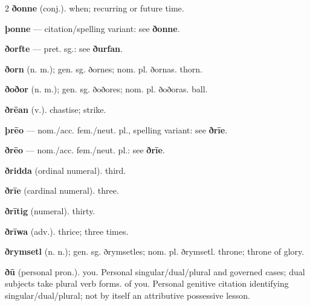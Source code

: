 \begin{multicols*}{2}
\textbf{ðonne} (conj.). when; recurring or future time.\par
\textbf{þonne} — citation/spelling variant: see \textbf{ðonne}.\par
\textbf{ðorfte} — pret. sg.: see \textbf{ðurfan}.\par
\textbf{ðorn} (n. m.); gen. sg. ðornes; nom. pl. ðornas. thorn.\par
\textbf{ðoðor} (n. m.); gen. sg. ðoðores; nom. pl. ðoðoras. ball.\par
\textbf{ðrēan} (v.). chastise; strike.\par
\textbf{þrēo} — nom./acc. fem./neut. pl., spelling variant: see \textbf{ðrīe}.\par
\textbf{ðrēo} — nom./acc. fem./neut. pl.: see \textbf{ðrīe}.\par
\textbf{ðridda} (ordinal numeral). third.\par
\textbf{ðrīe} (cardinal numeral). three.\par
\textbf{ðrītig} (numeral). thirty.\par
\textbf{ðrīwa} (adv.). thrice; three times.\par
\textbf{ðrymsetl} (n. n.); gen. sg. ðrymsetles; nom. pl. ðrymsetl. throne; throne of glory.\par
\textbf{ðū} (personal pron.). you. Personal singular/dual/plural and governed cases; dual subjects take plural verb forms. of you. Personal genitive citation identifying singular/dual/plural; not by itself an attributive possessive lesson.\par

\end{multicols*}
